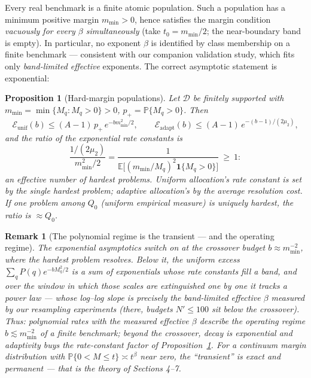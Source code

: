 \documentclass[11pt]{article}
\newtheorem{proposition}{Proposition}
\newtheorem{remark}{Remark}
\newcommand{\D}{\mathcal D}
\newcommand{\E}{\mathbb E}
\newcommand{\Pp}{\mathbb P}
\newcommand{\one}{\mathbf 1}
\newcommand{\mmin}{m_{\min}}
\begin{document}
Every real benchmark is a finite atomic population.  Such a population has
a minimum positive margin $\mmin>0$, hence satisfies the margin condition
\emph{vacuously for every $\beta$ simultaneously} (take $t_0=\mmin/2$; the
near-boundary band is empty).  In particular, no exponent $\beta$ is
identified by class membership on a finite benchmark --- consistent with our
companion validation study, which fits only \emph{band-limited effective}
exponents.  The correct asymptotic statement is exponential:

\begin{proposition}[Hard-margin populations]
\label{prop:hard-margin}
Let $\D$ be finitely supported with
$\mmin=\min\{M_q:M_q>0\}>0$, $p_+=\Pp\{M_q>0\}$.  Then
\[
\mathcal E_{\mathrm{unif}}(b)\le(A-1)\,p_+\,e^{-b\mmin^2/2},
\qquad
\mathcal E_{\mathrm{adapt}}(b)\le(A-1)\,e^{-(b-1)/(2\mu_2)},
\]
and the ratio of the exponential rate constants is
\[
\frac{1/(2\mu_2)}{\mmin^2/2}
=\frac{1}{\E\big[(\mmin/M_q)^2\one\{M_q>0\}\big]}\ \ge\ 1 :
\]
an \emph{effective number of hardest problems}.  Uniform allocation's rate
constant is set by the single hardest problem; adaptive allocation's by the
average resolution cost.  If one problem among $Q_0$ (uniform empirical
measure) is uniquely hardest, the ratio is $\approx Q_0$.
\end{proposition}

\begin{remark}[The polynomial regime is the transient --- and the operating
regime]
\label{rem:transient}
The exponential asymptotics switch on at the crossover budget
$b\approx\mmin^{-2}$, where the hardest problem resolves.  Below it, the
uniform excess $\sum_qP(q)e^{-bM_q^2/2}$ is a sum of exponentials whose
rate constants fill a band, and over the window in which those scales are
extinguished one by one it tracks a power law --- whose log--log slope is
precisely the band-limited effective $\beta$ measured by our resampling
experiments (there, budgets $N'\le100$ sit below the crossover).  Thus:
polynomial rates with the measured effective $\beta$ describe the operating
regime $b\lesssim\mmin^{-2}$ of a finite benchmark; beyond the crossover,
decay is exponential and adaptivity buys the rate-constant factor of
Proposition~\ref{prop:hard-margin}.  For a continuum margin distribution
with $\Pp\{0<M\le t\}\asymp t^\beta$ near zero, the ``transient'' is exact
and permanent --- that is the theory of Sections 4--7.
\end{remark}
\end{document}
